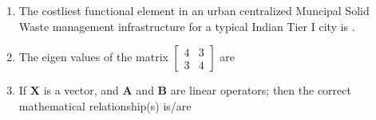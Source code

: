 \documentclass[journal]{IEEEtran}
\numberwithin{equation}{enumi}
\numberwithin{figure}{enumi}
\begin{document}
\begin{enumerate}[start=1, label={Q\arabic*.}]
  \begin{enumerate}[label=(\Alph*)]
  \end{enumerate}
\item The costliest functional element in an urban centralized Muncipal Solid Waste management infrastructure for a typical Indian Tier $\mathrm{I}$ city is \underline{\hspace{1.5cm}}.
 \begin{enumerate}[label=(\Alph*)]
  \end{enumerate}
\newpage
\item The eigen values of the matrix $\begin{bmatrix} 4 & 3 \\ 3 & 4 \end{bmatrix}$ are
 \begin{enumerate}[label=(\Alph*)]
  \end{enumerate}
\item If $\mathbf{X}$ is a vector, and $\mathbf{A}$ and $\mathbf{B}$ are linear operators; then the correct mathematical relationship(s) is/are
 \begin{enumerate}[label=(\Alph*)]
\end{enumerate}
\end{enumerate}
\end{document}
